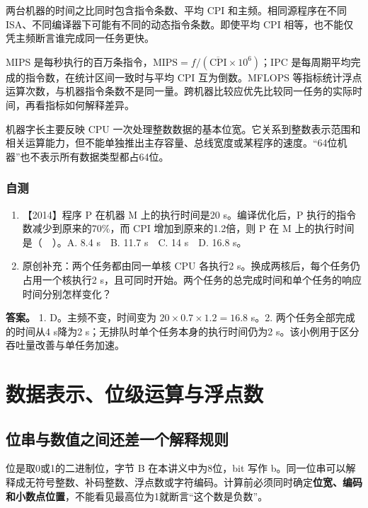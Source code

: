 两台机器的时间之比同时包含指令条数、平均 CPI 和主频。相同源程序在不同 ISA、不同编译器下可能有不同的动态指令条数。即使平均 CPI 相等，也不能仅凭主频断言谁完成同一任务更快。

MIPS 是每秒执行的百万条指令，\(\mathrm{MIPS}=f/(\overline{\mathrm{CPI}}\times10^6)\)；IPC 是每周期平均完成的指令数，在统计区间一致时与平均 CPI 互为倒数。MFLOPS 等指标统计浮点运算次数，与机器指令条数不是同一量。跨机器比较应优先比较同一任务的实际时间，再看指标如何解释差异。

机器字长主要反映 CPU 一次处理整数数据的基本位宽。它关系到整数表示范围和相关运算能力，但不能单独推出主存容量、总线宽度或某程序的速度。``64位机器''也不表示所有数据类型都占64位。

\subsection{自测}\label{co-self1}

\begin{enumerate}
\def\labelenumi{\arabic{enumi}.}
\tightlist
\item
  【2014】程序 P 在机器 M 上的执行时间是20 s。编译优化后，P 执行的指令数减少到原来的70\%，而 CPI 增加到原来的1.2倍，则 P 在 M 上的执行时间是（　）。A. 8.4 s　B. 11.7 s　C. 14 s　D. 16.8 s。
\item
  原创补充：两个任务都由同一单核 CPU 各执行2 s。换成两核后，每个任务仍占用一个核执行2 s，且可同时开始。两个任务的总完成时间和单个任务的响应时间分别怎样变化？
\end{enumerate}

\textbf{答案。} 1. D。主频不变，时间变为 \(20\times0.7\times1.2=16.8\) s。2. 两个任务全部完成的时间从4 s降为2 s；无排队时单个任务本身的执行时间仍为2 s。该小例用于区分吞吐量改善与单任务加速。

\chapter{数据表示、位级运算与浮点数}\label{co-ch2}

\section{位串与数值之间还差一个解释规则}\label{co-02-01}

位是取0或1的二进制位，字节 B 在本讲义中为8位，bit 写作 b。同一位串可以解释成无符号整数、补码整数、浮点数或字符编码。计算前必须同时确定\textbf{位宽、编码和小数点位置}，不能看见最高位为1就断言``这个数是负数''。

